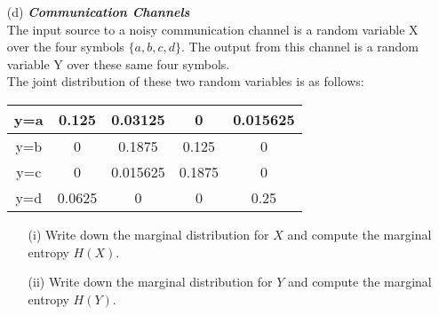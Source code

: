 \documentclass[]{article}
\begin{document}
\begin{itemize}
\item[(d)] \textbf{\textit{Communication Channels}}\\
The input source to a noisy communication channel is a random variable X over the
four symbols $\{a, b, c, d\}$. The output from this channel is a random variable Y over these same
four symbols. \\
\noindent 
The joint distribution of these two random variables is as follows:\\ 
\begin{center}
\begin{tabular}{|c|c|c|c|c|}
\hline
y=a & 0.125&0.03125&0&0.015625\\ \hline
y=b & 0&0.1875&0.125&0\\ \hline
y=c & 0&0.015625&0.1875&0\\ \hline
y=d & 0.0625&0&0&0.25\\ \hline
\end{tabular}
\end{center}

\begin{itemize}
\item[(i)]  Write down the marginal distribution for $X$ and compute the marginal entropy $H(X)$.
\item[(ii)]  Write down the marginal distribution for $Y$ and compute the marginal entropy $H(Y )$.
\end{itemize}
\end{itemize}
\end{document}
